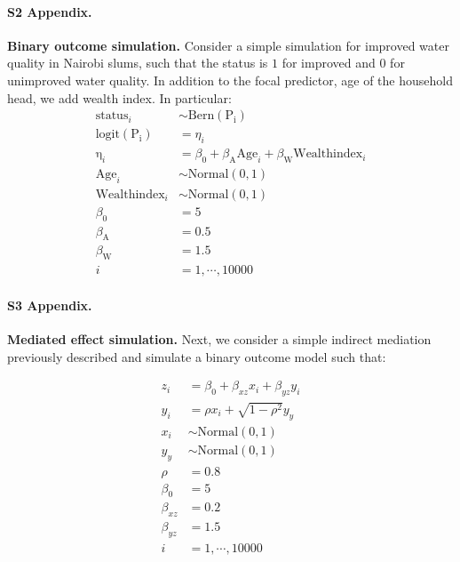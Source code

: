 \paragraph*{S2 Appendix.}
\label{S2_Appendix}
{\bf Binary outcome simulation.} Consider a simple simulation for improved water quality in Nairobi slums, such that the status is $1$ for improved and $0$ for unimproved water quality. In addition to the focal predictor, age of the household head, we add wealth index. In particular:
%
\begin{align}\label{sim:glm_two_pred}
\mathrm{status}_i &\sim \mathrm{Bern}(\mathrm{P_i}) \nonumber\\
\mathrm{logit}(\mathrm{P_i}) &= \eta_i \nonumber\\
\mathrm{\eta}_i &= \beta_0 + \beta_{\mathrm{A}}\mathrm{Age}_i + \beta_{\mathrm{W}}\mathrm{Wealthindex}_i \nonumber\\
\mathrm{Age}_i &\sim \mathrm{Normal}(0, 1) \nonumber\\
\mathrm{Wealthindex}_i &\sim \mathrm{Normal}(0, 1) \nonumber\\
\beta_0 &= 5 \nonumber\\
\beta_{\mathrm{A}} &= 0.5 \nonumber\\
\beta_{\mathrm{W}} &= 1.5 \nonumber\\
i &= 1,\cdots, 10000
\end{align}

\paragraph*{S3 Appendix.}
\label{S3_Appendix}
{\bf Mediated effect simulation.} Next, we consider a simple indirect mediation previously described and simulate a binary outcome model such that:

\begin{align}\label{sim:simple_mediate}
z_i &= \beta_0 + \beta_{xz} x_i + \beta_{yz} y_i \nonumber\\
y_i &= \rho x_i + \sqrt{1-\rho^2} y_y \nonumber\\
x_i &\sim \mathrm{Normal(0, 1)} \nonumber\\
y_y &\sim \mathrm{Normal(0, 1)} \nonumber\\
\rho &= 0.8 \nonumber\\
\beta_0 &= 5 \nonumber\\
\beta_{xz} &= 0.2 \nonumber\\
\beta_{yz} &= 1.5 \nonumber\\
i &= 1,\cdots, 10000
\end{align}


